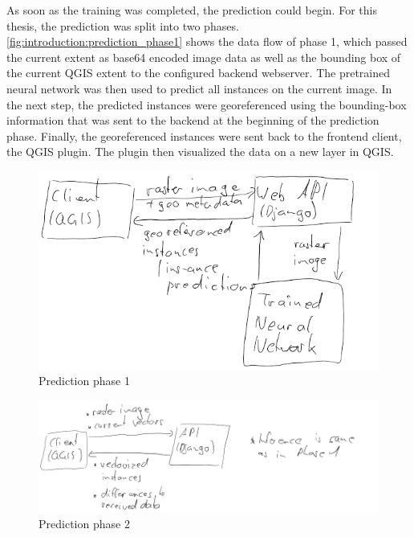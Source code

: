 As soon as the training was completed, the prediction could begin. For this thesis, the prediction was split into two phases. \autoref{fig:introduction:prediction_phase1} shows the data flow of phase 1, which passed the current extent as base64 encoded image data as well as the bounding box of the current QGIS extent to the configured backend webserver. The pretrained neural network was then used to predict all instances on the current image. In the next step, the predicted instances were georeferenced using the bounding-box information that was sent to the backend at the beginning of the prediction phase. Finally, the georeferenced instances were sent back to the frontend client, the QGIS plugin. The plugin then visualized the data on a new layer in QGIS.

\begin{figure}[H]
    \centering
	\includegraphics[width=0.9\linewidth]{chapters/introduction/images/inference_phase1.png}
	\caption{Prediction phase 1}
	\label{fig:introduction:prediction_phase1}
\end{figure}

\begin{figure}[H]
    \centering
	\includegraphics[width=0.9\linewidth]{chapters/introduction/images/inference_phase2.png}
	\caption{Prediction phase 2}
	\label{fig:introduction:prediction_phase2}
\end{figure}


